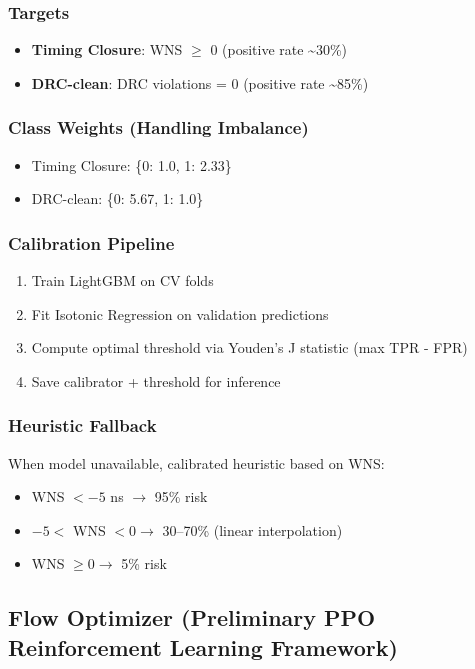 \documentclass[10pt,conference]{IEEEtran}
\begin{document}
\subsubsection{Targets}
\begin{itemize}
    \item \textbf{Timing Closure}: WNS $\ge$ 0 (positive rate \textasciitilde 30\%)
    \item \textbf{DRC-clean}: DRC violations = 0 (positive rate \textasciitilde 85\%)
\end{itemize}

\subsubsection{Class Weights (Handling Imbalance)}
\begin{itemize}
    \item Timing Closure: \{0: 1.0, 1: 2.33\}
    \item DRC-clean: \{0: 5.67, 1: 1.0\}
\end{itemize}

\subsubsection{Calibration Pipeline}
\begin{enumerate}
    \item Train LightGBM on CV folds
    \item Fit Isotonic Regression on validation predictions
    \item Compute optimal threshold via Youden's J statistic (max TPR - FPR)
    \item Save calibrator + threshold for inference
\end{enumerate}

\subsubsection{Heuristic Fallback}
When model unavailable, calibrated heuristic based on WNS:
\begin{itemize}
    \item WNS $< -5$ ns $\rightarrow$ 95\% risk
    \item $-5 <$ WNS $< 0 \rightarrow$ 30--70\% (linear interpolation)
    \item WNS $\ge 0 \rightarrow$ 5\% risk
\end{itemize}

\subsection{Flow Optimizer (Preliminary PPO Reinforcement Learning Framework)}
\label{sec:flow_optimizer}
\end{document}
